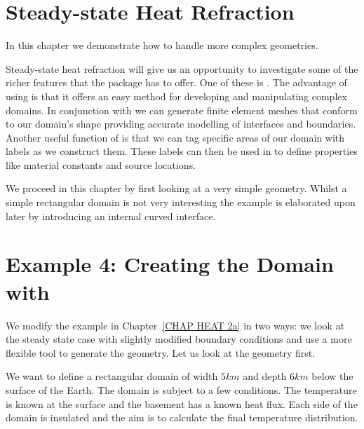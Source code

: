 
%
%
%

\section{Steady-state Heat Refraction}
\label{STEADY-STATE HEAT REFRACTION}

In this chapter we demonstrate how to handle more complex geometries. 

Steady-state heat refraction will give us an opportunity to investigate some of
the richer features that the \esc package has to offer. One of these is \pycad .
The advantage of using \pycad is that it offers an easy method for developing
and manipulating complex domains. In conjunction with \gmsh we can generate
finite element meshes that conform to our domain's shape providing accurate
modelling of interfaces and boundaries. Another useful function of \pycad is
that we can tag specific areas of our domain with labels as we construct them.
These labels can then be used in \esc to define properties like material
constants and source locations. 

We proceed in this chapter by first looking at a very simple geometry. Whilst a
simple rectangular domain is not very interesting the example is elaborated upon
later by introducing an internal curved interface.

\section{Example 4: Creating the Domain with \pycad}
\label{example4}
We modify the example in Chapter~\ref{CHAP HEAT 2a} in two ways: we look at the
steady state case with slightly modified boundary conditions and use a more
flexible tool to generate the geometry. Let us look at the geometry first. 

We want to define a rectangular domain of width $5 km$ and depth $6 km$ below
the surface of the Earth. The domain is subject to a few conditions. The
temperature is known at the surface and the basement has a known heat flux. Each
side of the domain is insulated and the aim is to calculate the final
temperature distribution.

